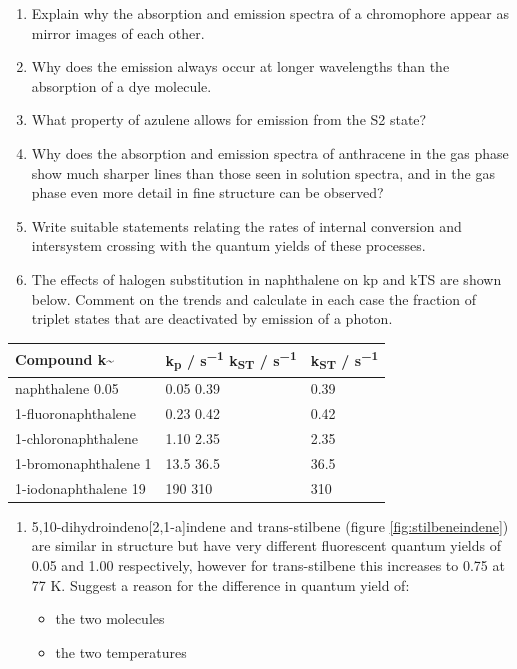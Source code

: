 \documentclass[
]{book}
\providecommand{\tightlist}{%
  \setlength{\itemsep}{0pt}\setlength{\parskip}{0pt}}
\begin{document}
\begin{enumerate}
\def\labelenumi{\arabic{enumi}.}
\item
  Explain why the absorption and emission spectra of a chromophore appear as mirror images of each other.
\item
  Why does the emission always occur at longer wavelengths than the absorption of a dye molecule.
\item
  What property of azulene allows for emission from the S2 state?
\item
  Why does the absorption and emission spectra of anthracene in the gas phase show much sharper lines than those seen in solution spectra, and in the gas phase even more detail in fine structure can be observed?
\item
  Write suitable statements relating the rates of internal conversion and intersystem crossing with the quantum yields of these processes.
\item
  The effects of halogen substitution in naphthalene on kp and kTS are shown below. Comment on the trends and calculate in each case the fraction of triplet states that are deactivated by emission of a photon.
\end{enumerate}

\begin{longtable}[]{@{}lll@{}}
\toprule
Compound \textbar{} k\textasciitilde{} & k\textsubscript{p} / s\textsuperscript{−1} \textbar{} k\textsubscript{ST} / s\textsuperscript{−1} & k\textsubscript{ST} / s\textsuperscript{−1} \textbar{}\tabularnewline
\midrule
\endhead
naphthalene \textbar{} 0.05 \textbar{} & 0.05 \textbar{} 0.39 \textbar{} & 0.39 \textbar{}\tabularnewline
1-fluoronaphthalene \textbar{} & 0.23 \textbar{} 0.42 \textbar{} & 0.42 \textbar{}\tabularnewline
1-chloronaphthalene \textbar{} & 1.10 \textbar{} 2.35 \textbar{} & 2.35 \textbar{}\tabularnewline
1-bromonaphthalene \textbar{} 1 & 13.5 \textbar{} 36.5 \textbar{} & 36.5 \textbar{}\tabularnewline
1-iodonaphthalene \textbar{} 19 & 190 \textbar{} 310 \textbar{} & 310 \textbar{}\tabularnewline
\bottomrule
\end{longtable}

\begin{enumerate}
\def\labelenumi{\arabic{enumi}.}
\setcounter{enumi}{6}
\tightlist
\item
  5,10-dihydroindeno{[}2,1-a{]}indene and trans-stilbene (figure \ref{fig:stilbeneindene}) are similar in structure but have very different fluorescent quantum yields of 0.05 and 1.00 respectively, however for trans-stilbene this increases to 0.75 at 77 K. Suggest a reason for the difference in quantum yield of:

  \begin{itemize}
  \tightlist
  \item
    the two molecules
  \item
    the two temperatures
  \end{itemize}
\end{enumerate}
\end{document}
